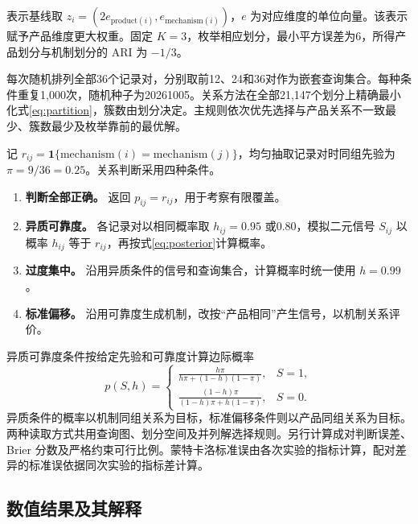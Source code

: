 \documentclass[UTF8,a4paper,zihao=-4,fontset=fandol]{ctexart}
\newcommand{\ind}{\mathbf 1}
\begin{document}
表示基线取 $z_i=(2e_{\mathrm{product}(i)},e_{\mathrm{mechanism}(i)})$，$e$ 为对应维度的单位向量。该表示赋予产品维度更大权重。固定 $K=3$，枚举相应划分，最小平方误差为6，所得产品划分与机制划分的 ARI 为 $-1/3$。

每次随机排列全部36个记录对，分别取前12、24和36对作为嵌套查询集合。每种条件重复1,000次，随机种子为20261005。关系方法在全部21,147个划分上精确最小化式\eqref{eq:partition}，簇数由划分决定。主规则依次优先选择与产品关系不一致最少、簇数最少及枚举靠前的最优解。

记 $r_{ij}=\ind\{\mathrm{mechanism}(i)=\mathrm{mechanism}(j)\}$，均匀抽取记录对时同组先验为 $\pi=9/36=0.25$。关系判断采用四种条件。

\begin{enumerate}
\item \textbf{判断全部正确。} 返回 $p_{ij}=r_{ij}$，用于考察有限覆盖。
\item \textbf{异质可靠度。} 各记录对以相同概率取 $h_{ij}=0.95$ 或0.80，模拟二元信号 $S_{ij}$ 以概率 $h_{ij}$ 等于 $r_{ij}$，再按式\eqref{eq:posterior}计算概率。
\item \textbf{过度集中。} 沿用异质条件的信号和查询集合，计算概率时统一使用 $h=0.99$。
\item \textbf{标准偏移。} 沿用可靠度生成机制，改按“产品相同”产生信号，以机制关系评价。
\end{enumerate}

异质可靠度条件按给定先验和可靠度计算边际概率
\begin{equation}
 p(S,h)=
 \begin{cases}
 \displaystyle\frac{h\pi}{h\pi+(1-h)(1-\pi)},&S=1,\\[0.7em]
 \displaystyle\frac{(1-h)\pi}{(1-h)\pi+h(1-\pi)},&S=0.
 \end{cases}
 \label{eq:posterior}
\end{equation}
异质条件的概率以机制同组关系为目标，标准偏移条件则以产品同组关系为目标。两种读取方式共用查询图、划分空间及并列解选择规则。另行计算成对判断误差、Brier 分数及严格约束可行比例。蒙特卡洛标准误由各次实验的指标计算，配对差异的标准误依据同次实验的指标差计算。

\subsection{数值结果及其解释}
\end{document}
